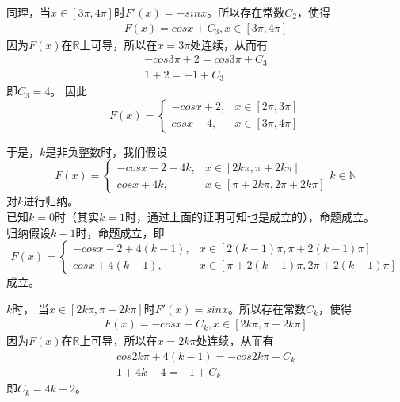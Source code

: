 \documentclass{article}
\begin{document}
\begin{itemize}
        同理，当$x \in [3\pi, 4\pi]$时$F'(x) = -sin x$。所以存在常数$C_2$，使得
        \begin{align*}
          F(x) = cosx + C_3, x \in [3\pi, 4\pi]
        \end{align*}
        因为$F(x)$在$\mathbb{R}$上可导，所以在$x = 3\pi$处连续，从而有
        \begin{align*}
          -cos 3\pi + 2 = cos 3\pi + C_3 \\
          1 + 2 = -1 + C_3
        \end{align*}
        即$C_3 = 4$。
        因此
        \begin{equation*}
          F(x) =
          \begin{cases}
            -cosx + 2, & x \in [2\pi, 3\pi] \\
            cosx + 4,  & x \in [3\pi, 4\pi]
          \end{cases}
        \end{equation*}

        于是，$k$是非负整数时，我们假设
        \begin{equation*}
          F(x) =
          \begin{cases}
            -cosx - 2 + 4k, & x \in [2k \pi, \pi + 2k \pi]        \\
            cosx + 4k,      & x \in [\pi + 2k \pi, 2\pi + 2k \pi]
          \end{cases}
          k \in \mathbb{N}
        \end{equation*}
        对$k$进行归纳。\\
        已知$k = 0$时（其实$k=1$时，通过上面的证明可知也是成立的），命题成立。\\
        归纳假设$k-1$时，命题成立，即
        \begin{equation*}
          F(x) =
          \begin{cases}
            -cosx - 2 + 4(k-1), & x \in [2(k-1) \pi, \pi + 2(k-1) \pi]        \\
            cosx + 4(k-1),      & x \in [\pi + 2(k-1) \pi, 2\pi + 2(k-1) \pi]
          \end{cases}
        \end{equation*}
        成立。

        $k$时，
        当$x \in [2k \pi, \pi + 2k \pi]$时$F'(x) = sin x$。所以存在常数$C_k$，使得
        \begin{align*}
          F(x) = -cos x + C_k, x \in [2k \pi, \pi + 2k \pi]
        \end{align*}
        因为$F(x)$在$\mathbb{R}$上可导，所以在$x = 2k\pi$处连续，从而有
        \begin{align*}
          cos 2k\pi + 4(k-1) = -cos 2k\pi + C_k \\
          1 + 4k - 4 = -1 + C_k
        \end{align*}
        即$C_k = 4k -2$。


\end{itemize}
\end{document}

